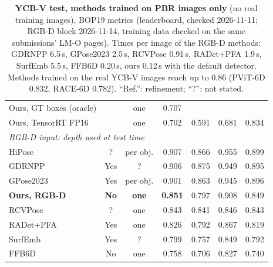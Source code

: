 \begin{table}[t]
\begin{tabular}{lcccccc}
    Ours, GT boxes (oracle) & & one & 0.707 & & & \\
    Ours, TensorRT FP16 & & one & 0.702 & 0.591 & 0.681 & 0.834 \\
    \midrule
    \multicolumn{7}{l}{\emph{RGB-D input: depth used at test time}} \\
    HiPose~\cite{lin2024hipose} & ? & per obj. & 0.907 & 0.866 & 0.955 & 0.899 \\
    GDRNPP~\cite{liu2022gdrnpp} & Yes & ? & 0.906 & 0.875 & 0.949 & 0.895 \\
    GPose2023~\cite{bop_gpose2023} & Yes & per obj. & 0.901 & 0.863 & 0.945 & 0.896 \\
    \textbf{Ours, RGB-D} & \textbf{No} & \textbf{one} & \textbf{0.851} & 0.797 & 0.908 & 0.849 \\
    RCVPose~\cite{wu2022rcvpose} & ? & one & 0.843 & 0.841 & 0.846 & 0.843 \\
    RADet+PFA~\cite{hai2023radet,hu2022pfa} & Yes & one & 0.826 & 0.792 & 0.867 & 0.819 \\
    SurfEmb~\cite{haugaard2022surfemb} & Yes & ? & 0.799 & 0.757 & 0.849 & 0.792 \\
    FFB6D~\cite{he2021ffb6d} & No & one & 0.758 & 0.706 & 0.827 & 0.740 \\
    \bottomrule
  \end{tabular}
  \caption{\textbf{YCB-V test, methods trained on PBR images only} (no real training images),
  BOP19 metrics (leaderboard, checked 2026-11-11; RGB-D block 2026-11-14, training data checked on
  the same submissions' LM-O pages). Times per image of the RGB-D methods: GDRNPP 6.5\,s, GPose2023
  2.5\,s, RCVPose 0.91\,s, RADet+PFA 1.9\,s, SurfEmb 5.5\,s, FFB6D 0.20\,s, ours 0.12\,s with the
  default detector. Methods trained on the real YCB-V images reach
  up to 0.86 (\eg PViT-6D 0.832, RACE-6D 0.782). ``Ref.'': refinement; ``?'': not stated.
  }
  \label{tab:ycbv}
\end{table}

